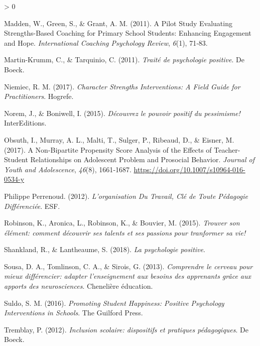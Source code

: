 \documentclass[
  french,
]{article}
\newlength{\cslhangindent}
\newenvironment{CSLReferences}[2] %
 {%
  \setlength{\parindent}{0pt}
  \ifodd #1 \everypar{\setlength{\hangindent}{\cslhangindent}}\ignorespaces\fi
  \ifnum #2 > 0
  \setlength{\parskip}{#2\baselineskip}
  \fi
 }%
 {}
\begin{document}
\begin{CSLReferences}{1}{0}
\leavevmode\hypertarget{ref-madden2011}{}%
Madden, W., Green, S., \& Grant, A. M. (2011). A Pilot Study Evaluating Strengths-Based Coaching for Primary School Students: {Enhancing} Engagement and Hope. \emph{International Coaching Psychology Review}, \emph{6}(1), 71‑83.

\leavevmode\hypertarget{ref-martin-krumm2011}{}%
Martin-Krumm, C., \& Tarquinio, C. (2011). \emph{{Traité de psychologie positive}}. {De Boeck}.

\leavevmode\hypertarget{ref-niemiec2017b}{}%
Niemiec, R. M. (2017). \emph{Character Strengths Interventions: A Field Guide for Practitioners}. {Hogrefe}.

\leavevmode\hypertarget{ref-norem2015}{}%
Norem, J., \& Boniwell, I. (2015). \emph{{Découvrez le pouvoir positif du pessimisme!}} {InterEditions}.

\leavevmode\hypertarget{ref-obsuth2017}{}%
Obsuth, I., Murray, A. L., Malti, T., Sulger, P., Ribeaud, D., \& Eisner, M. (2017). A {Non}-Bipartite {Propensity Score Analysis} of the {Effects} of {Teacher}-{Student Relationships} on {Adolescent Problem} and {Prosocial Behavior}. \emph{Journal of Youth and Adolescence}, \emph{46}(8), 1661‑1687. \url{https://doi.org/10.1007/s10964-016-0534-y}

\leavevmode\hypertarget{ref-philippeperrenoud2012}{}%
Philippe Perrenoud. (2012). \emph{L'organisation Du Travail, Clé de Toute Pédagogie Différenciée}. {ESF}.

\leavevmode\hypertarget{ref-robinson2015}{}%
Robinson, K., Aronica, L., Robinson, K., \& Bouvier, M. (2015). \emph{{Trouver son élément: comment découvrir ses talents et ses passions pour tranformer sa vie!}}

\leavevmode\hypertarget{ref-shankland2018b}{}%
Shankland, R., \& Lantheaume, S. (2018). \emph{{La psychologie positive}}.

\leavevmode\hypertarget{ref-sousa2013}{}%
Sousa, D. A., Tomlinson, C. A., \& Sirois, G. (2013). \emph{{Comprendre le cerveau pour mieux différencier: adapter l'enseignement aux besoins des apprenants grâce aux apports des neurosciences}}. {Chenelière éducation}.

\leavevmode\hypertarget{ref-suldo2016a}{}%
Suldo, S. M. (2016). \emph{Promoting Student Happiness: Positive Psychology Interventions in Schools}. {The Guilford Press}.

\leavevmode\hypertarget{ref-tremblay2012}{}%
Tremblay, P. (2012). \emph{{Inclusion scolaire: dispositifs et pratiques pédagogiques}}. {De Boeck}.


\end{CSLReferences}
\end{document}
